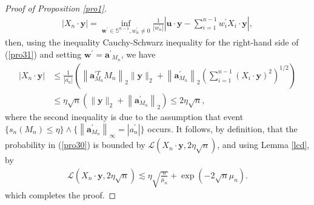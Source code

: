 \documentclass[10pt,a4paper]{amsart}
\begin{document}
\begin{proof}[Proof of Proposition \ref{pro1}]
\begin{align}
\left|X_n \cdot \boldsymbol{y}\right|  =\inf _{\boldsymbol{w}^{\prime} \in \mathbb{S}^{n-1}, w_n^{\prime} \neq 0} \frac{1}{\left|w_n^{\prime}\right|}\left|\boldsymbol{u} \cdot \boldsymbol{y}-\sum_{i=1}^{n-1} w_i^{\prime} X_i \cdot \boldsymbol{y}\right|,
\end{align}
then, using the inequality Cauchy-Schwarz inequality for the right-hand side of (\ref{pro31}) and setting $\boldsymbol{w}^{\prime}=\boldsymbol{a}^{\prime}{ }_{M_n}$, we have
\begin{align*}
\left|X_n \cdot \boldsymbol{y}\right|&\leq\frac{1}{\left|a_n^{\prime}\right|}\left(\left\|\boldsymbol{a}_{M_n}^{\prime T} M_n\right\|_2\|\boldsymbol{y}\|_2+\left\|\boldsymbol{a}_{M_n}^{\prime}\right\|_2\left(\sum_{i=1}^{n-1}\left(X_i \cdot \boldsymbol{y}\right)^2\right)^{1 / 2}\right)\\
&\leq\eta\sqrt{n}\left(\|\boldsymbol{y}\|_2+\left\|\boldsymbol{a}_{M_n}^{\prime}\right\|_2\right) \leq 2 \eta \sqrt{n},
\end{align*}
where the second inequality is due to the assumption that event $\{s_n\left(M_n\right) \leq \eta\} \wedge\{\left\|\boldsymbol{a}^{\prime}_{M_n}\right\|_{\infty}=\left|a_n^{\prime}\right|\}$ occurs. It follows, by definition, that the probability in (\ref{pro30}) is bounded by $\mathcal{L}\left(X_n \cdot \boldsymbol{y}, 2 \eta \sqrt{n}\right)$, and using Lemma \ref{lcd}, by
\begin{align*}
\mathcal{L}\left(X_n \cdot \boldsymbol{y}, 2 \eta \sqrt{n}\right) \lesssim \eta \sqrt{\frac{n}{\mu_{n}}}+\exp (-2\sqrt{n}\mu_{n}).
\end{align*}
which completes the proof.
\end{proof}
\end{document}
